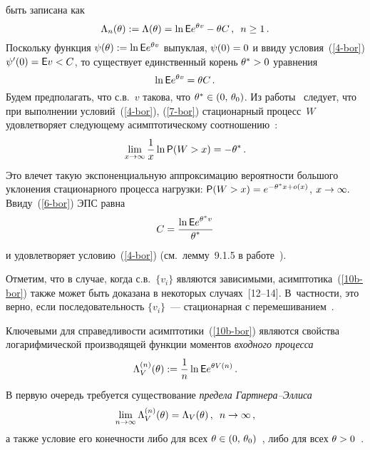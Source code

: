 \begin{multicols}{2}
 быть записана как
\begin{equation*}
\Lambda_n(\theta):=\Lambda(\theta)=\ln \e e^{\theta v}-\theta C\,,\enskip
n\ge 1\,. %
\end{equation*}
Поскольку  функция $\psi(\theta):=\ln {\sf E} e^{\theta v}$  выпуклая,
$\psi(0)\hm=0$ и ввиду   условия~(\ref{4-bor})  $\psi^{\prime}(0)\hm=\e v\hm<C$, то
существует   единственный корень $\theta^*\hm>0$ уравнения
\begin{equation}
\ln {\sf E} e^{\theta v}=\theta C\,. \label{6-bor}
\end{equation}
   Будем предполагать, что с.в.~$v$ такова, что
 $\theta^*\hm\in (0,\,\theta_0)$.
Из работы~\cite{Glynn} следует, что при выполнении  условий~(\ref{4-bor}), (\ref{7-bor})
 стационарный процесс~$W$
 удовлетворяет   следующему асимптотическому соотношению~\cite{Ganesh, Glynn}:
\begin{equation}
\lim\limits_ {x\to \infty}\displaystyle\frac{\displaystyle 1\mathstrut}{\displaystyle x\mathstrut}\ln {\sf P}(W> x)=-\theta^*\,. \label{10b-bor}
\end{equation}
Это  влечет такую экспоненциальную аппроксимацию  вероятности
большого уклонения стационарного процесса нагрузки:
 ${\sf P}(W> x)=e^{-\theta^*x+o(x)}$, $x\hm\to \infty.$
 Ввиду~(\ref{6-bor}) ЭПС равна
\begin{equation}
C=\displaystyle\frac{\displaystyle \ln{\sf E} e ^{\theta^* v}\mathstrut}{\displaystyle \theta^*\mathstrut} \label{12b-bor}
\end{equation}
и удовлетворяет условию~(\ref{4-bor}) (см.\ лемму~9.1.5 в работе~\cite{Chang}).

Отметим, что в  случае, когда с.в.\ $\{v_i\}$ являются зависимыми,
 асимптотика~(\ref{10b-bor}) также  может быть доказана в некоторых 
 случаях~[12--14]. В~частности, это верно, если
последовательность $\{v_i\}$~---  стационарная с перемешиванием~\cite{Lewis}.

Ключевыми для справедливости  асимптотики~(\ref{10b-bor}) являются
свойства   логарифмической производящей функции моментов {\it
входного процесса}
\begin{equation*}
%
\Lambda_V^{(n)}(\theta):=\fr{1}{n} \ln \e e ^{\theta V(n)}\,.
\end{equation*}
В первую очередь требуется   существование   {\it предела
Гарт\-не\-ра--Эл\-лиса}~\cite {Glynn, Chang}
\begin{equation*}
\lim\limits_{n\to \infty} \Lambda_V^{(n)}(\theta)=\Lambda _V
(\theta)\,,\enskip n\to \infty\,, %
\end{equation*}
а также  условие  его конечности либо для всех $\theta\hm\in
(0,\,\theta_0)$~\cite{Ganesh, Glynn}, либо для всех $\theta\hm>0$~\cite{Chang}.


\end{multicols}
